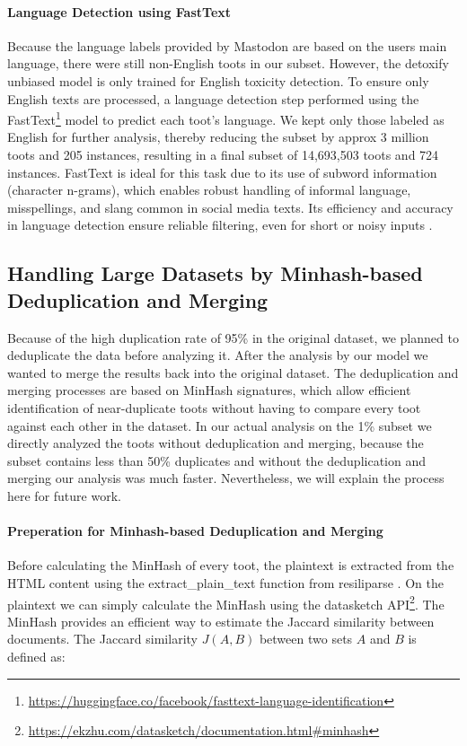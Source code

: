 \paragraph{Language Detection using FastText}\label{step:language-detection}
Because the language labels provided by Mastodon are based on the users main language, there were still non-English toots in our subset. However, the detoxify unbiased model is only trained for English toxicity detection. To ensure only English texts are processed, a language detection step performed using the FastText\footnote{\url{https://huggingface.co/facebook/fasttext-language-identification}} model to predict each toot's language. We kept only those labeled as English for further analysis, thereby reducing the subset by approx 3 million toots and 205 instances, resulting in a final subset of 14,693,503 toots and 724 instances.
FastText is ideal for this task due to its use of subword information (character n-grams), which enables robust handling of informal language, misspellings, and slang common in social media texts. Its efficiency and accuracy in language detection ensure reliable filtering, even for short or noisy inputs \cite{joulin:2017}.

\subsection*{Handling Large Datasets by Minhash-based Deduplication and Merging}
Because of the high duplication rate of 95\% in the original dataset, we planned to deduplicate the data before analyzing it. After the analysis by our model we wanted to merge the results back into the original dataset. The deduplication and merging processes are based on MinHash signatures, which allow efficient identification of near-duplicate toots without having to compare every toot against each other in the dataset. In our actual analysis on the 1\% subset we directly analyzed the toots without deduplication and merging, because the subset contains less than 50\% duplicates and without the deduplication and merging our analysis was much faster. Nevertheless, we will explain the process here for future work.

\paragraph{Preperation for Minhash-based Deduplication and Merging}\label{step:preprocess} 
Before calculating the MinHash of every toot, the plaintext is extracted from the HTML content using the extract\_plain\_text function from resiliparse \cite{bevendorff:2018}. On the plaintext we can simply calculate the MinHash using the datasketch API\footnote{\url{https://ekzhu.com/datasketch/documentation.html\#minhash}}. The MinHash provides an efficient way to estimate the Jaccard similarity between documents. The Jaccard similarity $J(A,B)$ between two sets $A$ and $B$ is defined as:

